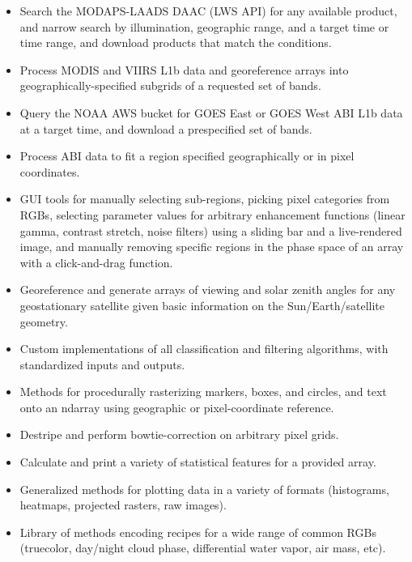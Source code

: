 \documentclass[12pt]{article}
\begin{document}
\begin{itemize}
    \item{Search the MODAPS-LAADS DAAC (LWS API) for any available product, and narrow search by illumination, geographic range, and a target time or time range, and download products that match the conditions.}
    \item{Process MODIS and VIIRS L1b data and georeference arrays into geographically-specified subgrids of a requested set of bands.}
    \item{Query the NOAA AWS bucket for GOES East or GOES West ABI L1b data at a target time, and download a prespecified set of bands.}
    \item{Process ABI data to fit a region specified geographically or in pixel coordinates.}
    \item{GUI tools for manually selecting sub-regions, picking pixel categories from RGBs, selecting parameter values for arbitrary enhancement functions (linear gamma, contrast stretch, noise filters) using a sliding bar and a live-rendered image, and manually removing specific regions in the phase space of an array with a click-and-drag function.}
    \item{Georeference and generate arrays of viewing and solar zenith angles for any geostationary satellite given basic information on the Sun/Earth/satellite geometry.}
    \item{Custom implementations of all classification and filtering algorithms, with standardized inputs and outputs.}
    \item{Methods for procedurally rasterizing markers, boxes, and circles, and text onto an ndarray using geographic or pixel-coordinate reference.}
    \item{Destripe and perform bowtie-correction on arbitrary pixel grids.}
    \item{Calculate and print a variety of statistical features for a provided array.}
    \item{Generalized methods for plotting data in a variety of formats (histograms, heatmaps, projected rasters, raw images).}
    \item{Library of methods encoding recipes for a wide range of common RGBs (truecolor, day/night cloud phase, differential water vapor, air mass, etc).}
\end{itemize}
\end{document}
